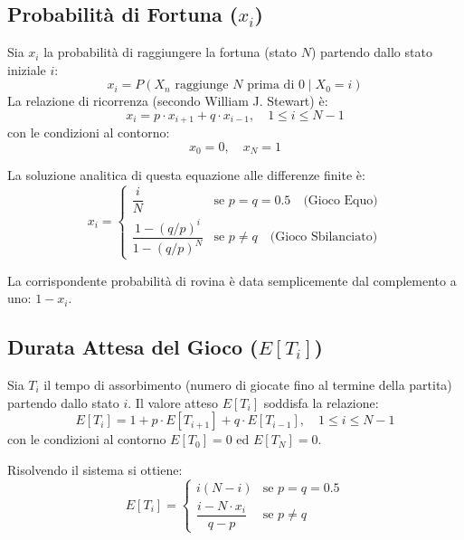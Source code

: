 \documentclass[11pt,a4paper]{article}
\begin{document}
\subsection{Probabilità di Fortuna ($x_i$)}
Sia $x_i$ la probabilità di raggiungere la fortuna (stato $N$) partendo dallo stato iniziale $i$:
\begin{equation}
x_i = P(X_n \text{ raggiunge } N \text{ prima di } 0 \mid X_0 = i)
\end{equation}
La relazione di ricorrenza (secondo William J. Stewart) è:
\begin{equation}
x_i = p \cdot x_{i+1} + q \cdot x_{i-1}, \quad 1 \le i \le N-1
\end{equation}
con le condizioni al contorno:
\begin{equation}
x_0 = 0, \quad x_N = 1
\end{equation}

La soluzione analitica di questa equazione alle differenze finite è:
\begin{equation}
x_i = 
\begin{cases} 
\dfrac{i}{N} & \text{se } p = q = 0.5 \quad \text{(Gioco Equo)} \\[10pt]
\dfrac{1 - (q/p)^i}{1 - (q/p)^N} & \text{se } p \neq q \quad \text{(Gioco Sbilanciato)}
\end{cases}
\end{equation}

La corrispondente probabilità di rovina è data semplicemente dal complemento a uno: $1 - x_i$.

\subsection{Durata Attesa del Gioco ($E[T_i]$)}
Sia $T_i$ il tempo di assorbimento (numero di giocate fino al termine della partita) partendo dallo stato $i$. Il valore atteso $E[T_i]$ soddisfa la relazione:
\begin{equation}
E[T_i] = 1 + p \cdot E[T_{i+1}] + q \cdot E[T_{i-1}], \quad 1 \le i \le N-1
\end{equation}
con le condizioni al contorno $E[T_0] = 0$ ed $E[T_N] = 0$.

Risolvendo il sistema si ottiene:
\begin{equation}
E[T_i] = 
\begin{cases} 
i(N - i) & \text{se } p = q = 0.5 \\[10pt]
\dfrac{i - N \cdot x_i}{q - p} & \text{se } p \neq q
\end{cases}
\end{equation}
\end{document}
